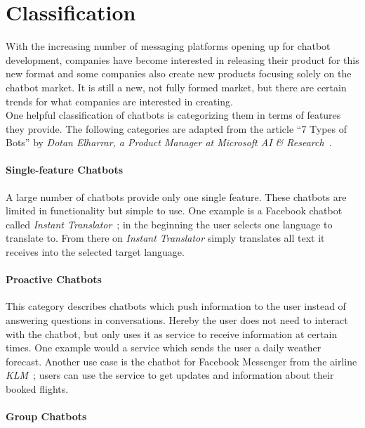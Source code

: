 \section{Classification}
\label{classification}


With the increasing number of messaging platforms opening up for chatbot development,
companies have become interested in releasing their product for this new format and some companies also create new products focusing solely on the chatbot market.
It is still a new, not fully formed market, but there are certain trends for what companies are interested in creating.
\\

One helpful classification of chatbots is categorizing them in terms of features they provide.
The following categories are adapted from the article ``7 Types of Bots'' by \emph{Dotan Elharrar, a Product Manager at Microsoft AI \& Research}~\cite{bottypes}.


\paragraph{Single-feature Chatbots}

A large number of chatbots provide only one single feature.
These chatbots are limited in functionality but simple to use.
One example is a Facebook chatbot called \emph{Instant Translator}~\cite{instanttranslator};
in the beginning the user selects one language to translate to. From there on \emph{Instant Translator} simply translates all text it receives into the selected target language.


\paragraph{Proactive Chatbots}

This category describes chatbots which push information to the user instead of answering questions in conversations.
Hereby the user does not need to interact with the chatbot, but only uses it as service to receive information at certain times.
One example would a service which sends the user a daily weather forecast.
Another use case is the chatbot for Facebook Messenger from the airline \emph{KLM}~\cite{klm}; users can use the service to get updates and information about their booked flights.


\paragraph{Group Chatbots}

